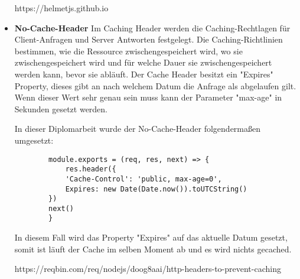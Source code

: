\begin{itemize}
        \cite{Helmet}
        https://helmetjs.github.io
    \item \textbf{No-Cache-Header}
        \newline
        Im Caching Header werden die Caching-Rechtlagen für Client-Anfragen und Server Antworten festgelegt. Die Caching-Richtlinien bestimmen, wie die Ressource zwischengespeichert wird, wo sie zwischengespeichert wird und für welche Dauer sie zwischengespeichert werden kann, bevor sie abläuft. Der Cache Header besitzt ein "Expires" Property, dieses gibt an nach welchem Datum die Anfrage als abgelaufen gilt. Wenn dieser Wert sehr genau sein muss kann der Parameter "max-age" in Sekunden gesetzt werden.

        In dieser Diplomarbeit wurde der No-Cache-Header folgendermaßen umgesetzt:

        \begin{lstlisting}
        module.exports = (req, res, next) => {
            res.header({
            'Cache-Control': 'public, max-age=0',
            Expires: new Date(Date.now()).toUTCString()
        })
        next()
        }
        \end{lstlisting}

        In diesem Fall wird das Property "Expires" auf das aktuelle Datum gesetzt, somit ist läuft der Cache im selben Moment ab und es wird nichts gecached.

        \cite{No_Cache_Header}
        https://reqbin.com/req/nodejs/doog8aai/http-headers-to-prevent-caching
\end{itemize}